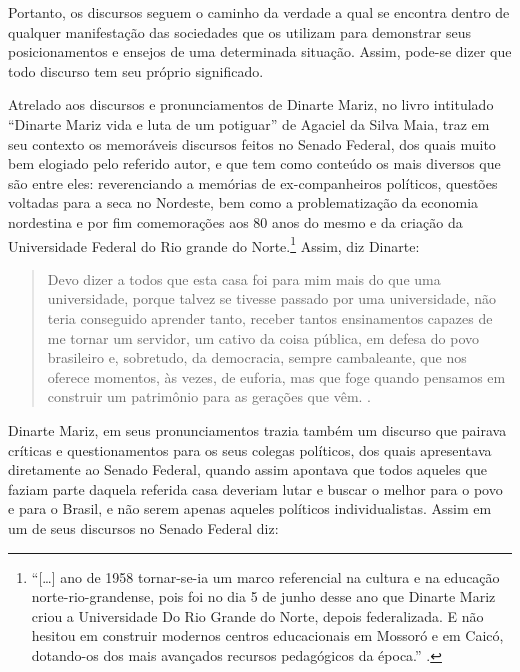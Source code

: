 \begin{refsection}
    Portanto, os discursos seguem o caminho da verdade a qual se encontra dentro de qualquer manifestação das sociedades que os utilizam para demonstrar seus posicionamentos e ensejos de uma determinada situação. Assim, pode-se dizer que todo discurso tem seu próprio significado. 

    Atrelado aos discursos e pronunciamentos de Dinarte Mariz, no livro intitulado ``Dinarte Mariz vida e luta de um potiguar'' de Agaciel da Silva Maia, traz em seu contexto os memoráveis discursos feitos no Senado Federal, dos quais muito bem elogiado pelo referido autor, e que tem como conteúdo os mais diversos que são entre eles: reverenciando a memórias de ex-companheiros políticos, questões voltadas para a seca no Nordeste, bem como a problematização da economia nordestina e por fim comemorações aos 80 anos do mesmo e da criação da Universidade Federal do Rio grande do Norte.\footnote{``[\dots] ano de 1958 tornar-se-ia um marco referencial na cultura e na educação norte-rio-grandense, pois foi no dia 5 de junho desse ano que Dinarte Mariz criou a Universidade Do Rio Grande do Norte, depois federalizada. E não hesitou em construir modernos centros educacionais em Mossoró e em Caicó, dotando-os dos mais avançados recursos pedagógicos da época.'' \cite[p.~38]{Maia2005Dinarte}.} Assim, diz Dinarte:

    \begin{quotation}
        Devo dizer a todos que esta casa foi para mim mais do que uma universidade, porque talvez se tivesse passado por uma universidade, não teria conseguido aprender tanto, receber tantos ensinamentos capazes de me tornar um servidor, um cativo da coisa pública, em defesa do povo brasileiro e, sobretudo, da democracia, sempre cambaleante, que nos oferece momentos, às vezes, de euforia, mas que foge quando pensamos em construir um patrimônio para as gerações que vêm. \cite[p.~173--174]{Maia2005Dinarte}.
    \end{quotation}

    Dinarte Mariz, em seus pronunciamentos trazia também um discurso que pairava críticas e questionamentos para os seus colegas políticos, dos quais apresentava diretamente ao Senado Federal, quando assim apontava que todos aqueles que faziam parte daquela referida casa deveriam lutar e buscar o melhor para o povo e para o Brasil, e não serem apenas aqueles políticos individualistas. Assim em um de seus discursos no Senado Federal diz:


\end{refsection}
